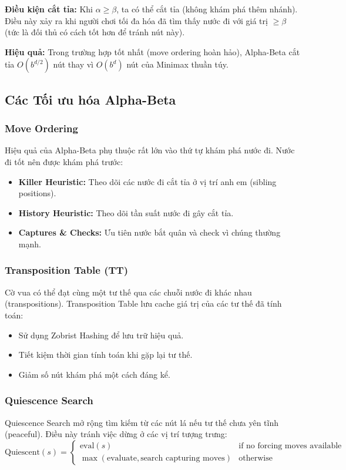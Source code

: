 \textbf{Điều kiện cắt tỉa:}
Khi $\alpha \geq \beta$, ta có thể cắt tỉa (không khám phá thêm nhánh). Điều này xảy ra khi người chơi tối đa hóa đã tìm thấy nước đi với giá trị $\geq \beta$ (tức là đối thủ có cách tốt hơn để tránh nút này).

\textbf{Hiệu quả:} Trong trường hợp tốt nhất (move ordering hoàn hảo), Alpha-Beta cắt tỉa $O(b^{d/2})$ nút thay vì $O(b^d)$ nút của Minimax thuần túy.

\subsection{Các Tối ưu hóa Alpha-Beta}

\subsubsection{Move Ordering}
Hiệu quả của Alpha-Beta phụ thuộc rất lớn vào thứ tự khám phá nước đi. Nước đi tốt nên được khám phá trước:
\begin{itemize}
    \item \textbf{Killer Heuristic:} Theo dõi các nước đi cắt tỉa ở vị trí anh em (sibling positions).
    \item \textbf{History Heuristic:} Theo dõi tần suất nước đi gây cắt tỉa.
    \item \textbf{Captures \& Checks:} Ưu tiên nước bắt quân và check vì chúng thường mạnh.
\end{itemize}

\subsubsection{Transposition Table (TT)}
Cờ vua có thể đạt cùng một tư thế qua các chuỗi nước đi khác nhau (transpositions). Transposition Table lưu cache giá trị của các tư thế đã tính toán:
\begin{itemize}
    \item Sử dụng Zobrist Hashing để lưu trữ hiệu quả.
    \item Tiết kiệm thời gian tính toán khi gặp lại tư thế.
    \item Giảm số nút khám phá một cách đáng kể.
\end{itemize}

\subsubsection{Quiescence Search}
Quiescence Search mở rộng tìm kiếm từ các nút lá nếu tư thế chưa yên tĩnh (peaceful). Điều này tránh việc dừng ở các vị trí tượng trưng:
\begin{equation*}
\text{Quiescent}(s) = \begin{cases}
\text{eval}(s) & \text{if no forcing moves available} \\
\max(\text{evaluate}, \text{search capturing moves}) & \text{otherwise}
\end{cases}
\end{equation*}


